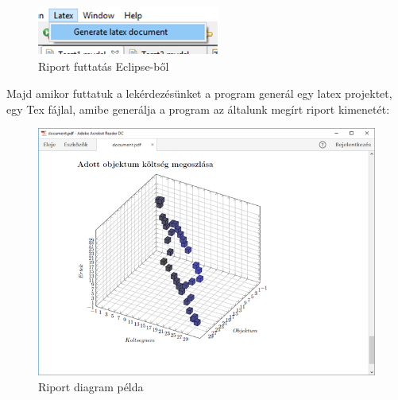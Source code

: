 \begin{figure}[!ht]
\centering
\includegraphics[width=60mm, keepaspectratio]{figures/run.png}
\caption{Riport futtatás Eclipse-ből} 
\label{fig:Overview}
\end{figure}

\newpage
Majd amikor futtatuk a lekérdezésünket a program generál egy latex projektet,
egy Tex fájlal, amibe generálja a program az általunk megírt riport kimenetét:

 \begin{figure}[!ht]
\centering
\includegraphics[width=120mm, keepaspectratio]{figures/Report.png}
\caption{Riport diagram példa} 
\label{fig:Overview}
\end{figure}





